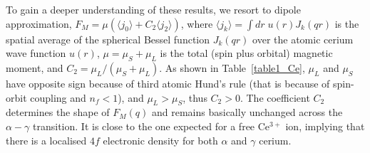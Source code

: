\documentclass[10pt]{ruthesis}
\begin{document}
{To gain a deeper understanding of these results, we resort to dipole
approximation, $F_M = \mu (\langle j_0 \rangle + C_2
\langle j_2 \rangle)$, where $\langle j_k \rangle = \int dr\; u(r)
J_k(qr)$ is the spatial average of the spherical Bessel function
$J_k(qr)$ over the atomic cerium wave function $u(r)$,
$\mu=\mu_S+\mu_L$ is the total (spin plus orbital) magnetic moment,
and $C_2 = \mu_L/(\mu_S + \mu_L)$.  As shown in Table~\ref{table1_Ce},
$\mu_L$ and $\mu_S$ have opposite sign because of third atomic Hund's
rule (that is because of spin-orbit coupling and $n_f<1$), and
$\mu_L>\mu_S$, thus $C_2>0$.  The coefficient $C_2$ determines the
shape of $F_M(q)$ and remains basically unchanged across the
$\alpha-\gamma$ transition. It is close to the one expected for a free
Ce$^{3+}$ ion, implying that there is a localised $4f$ electronic
density for both $\alpha$ and $\gamma$ cerium.





}
\end{document}
